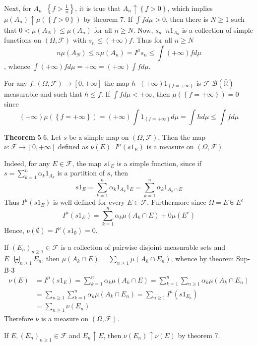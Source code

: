 \documentclass[a4paper]{article}
\newcommand{\obj}[1]{\left\{ #1 \right \}}
\newcommand{\clo}[1]{\left [ #1 \right ]}
\newcommand{\brac}[1]{\left ( #1 \right )}
\newcommand{\Rbar}{{\bar{\mathbb{R}}}}
\newcommand{\Zinf}{\clo{ 0, +\infty }}
\newcommand{\Fcal}{\mathcal{F}}
\newcommand{\borel}[1]{\mathcal{B}\brac{#1}}
\newcommand{\defn}{\mathop{\overset{\Delta}{=}}\nolimits}
\begin{document}
Next, for $A_n\defn\obj{f>\frac{1}{n}}$, it is true that $A_n\uparrow\obj{f>0}$, which implies $\mu\brac{A_n}\uparrow \mu\brac{\obj{f>0}}$ by theorem 7. If $\int f d\mu > 0$, then there is $N\geq1$ such that $0<\mu\brac{A_N}\leq \mu\brac{A_n}$ for all $n\geq N$. Now, $s_n\defn n 1_{A_n}$ is a collection of simple functions on $\brac{\Omega, \Fcal}$ with $s_n\leq \brac{+\infty} f$. Thus for all $n\geq N$ \[n \mu\brac{A_N} \leq n \mu\brac{A_n} = I^\mu{s_n}\leq \int \brac{+\infty} f d\mu\], whence $\int \brac{+\infty} f d\mu=+\infty = \brac{+\infty} \int f d\mu$.

For any $f:\brac{\Omega, \Fcal}\to\Zinf$ the map $h\defn\brac{+\infty} 1_{\obj{f=+\infty}}$ is $\Fcal$-$\borel{\Rbar}$ measurable and such that $h\leq f$. If $\int f d\mu < +\infty$, then $\mu\brac{\obj{f=+\infty}}=0$ since \[ \brac{+\infty} \mu\brac{\obj{f=+\infty}} = \brac{+\infty} \int 1_{\obj{f=+\infty}} d\mu = \int h d\mu \leq \int f d\mu\]

\label{thm:simple_int_meas} \noindent \textbf{Theorem} 5-6.
Let $s$ be a simple map on $\brac{\Omega, \Fcal}$. Then the map $\nu:\Fcal\to\Zinf$ defined as $\nu\brac{E}\defn I^\mu\brac{s 1_E}$ is a measure on $\brac{\Omega, \Fcal}$.

Indeed, for any $E\in\Fcal$, the map $s 1_E$ is a simple function, since if $s = \sum_{k=1}^n \alpha_k 1_{A_k}$ is a partition of $s$, then \[s 1_E =  \sum_{k=1}^n \alpha_k 1_{A_k} 1_E = \sum_{k=1}^n \alpha_k 1_{A_k\cap E}\] Thus $I^\mu\brac{s 1_E}$ is well defined for every $E\in \Fcal$. Furthermore since $\Omega= E \uplus E^c$ \[I^\mu\brac{s 1_E} = \sum_{k=1}^n \alpha_k \mu\brac{A_k\cap E} + 0 \mu\brac{E^c}\] Hence, $\nu\brac{\emptyset} = I^\mu\brac{s 1_\emptyset} = 0$.

If $\brac{E_n}_{n\geq1}\in \Fcal$ is a collection of pairwise disjoint measurable sets and $E\defn \biguplus_{n\geq1} E_n$, then $\mu\brac{A_k\cap E} = \sum_{n\geq1} \mu\brac{A_k\cap E_n}$, whence by theorem Sup-B-3 \begin{align*}\nu\brac{E} &= I^\mu\brac{s 1_E} = \sum_{k=1}^n \alpha_k \mu\brac{A_k\cap E} = \sum_{k=1}^n \sum_{n\geq1} \alpha_k \mu\brac{A_k\cap E_n} \\ &= \sum_{n\geq1} \sum_{k=1}^n \alpha_k \mu\brac{A_k\cap E_n} = \sum_{n\geq1} I^\mu\brac{s 1_{E_n}}\\ &= \sum_{n\geq1} \nu\brac{E_n}\end{align*} Therefore $\nu$ is a measure on $\brac{\Omega, \Fcal}$.

If $E,\brac{E_n}_{n\geq 1}\in \Fcal$ and $E_n\uparrow E$, then $\nu\brac{E_n}\uparrow\nu\brac{E}$ by theorem 7.\\
\end{document}
